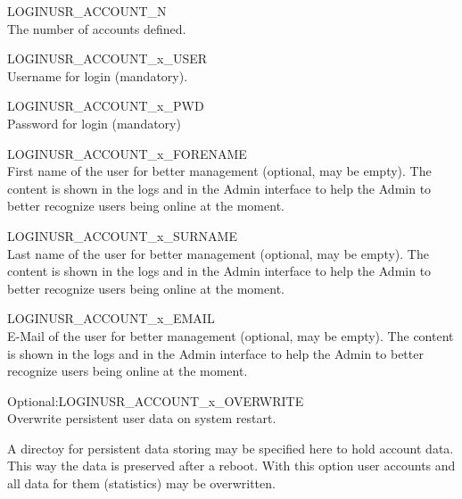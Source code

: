 \begin{description}

  LOGINUSR\_ACCOUNT\_N\\
  The number of accounts defined.\\



  LOGINUSR\_ACCOUNT\_x\_USER\\
  Username for login (mandatory).



  LOGINUSR\_ACCOUNT\_x\_PWD\\
  Password for login (mandatory)



  LOGINUSR\_ACCOUNT\_x\_FORENAME\\
  First name of the user for better management (optional, may be empty).
  The content is shown in the logs and in the Admin interface to help the Admin
  to better recognize users being online at the moment.



  LOGINUSR\_ACCOUNT\_x\_SURNAME\\
  Last name of the user for better management (optional, may be empty).
  The content is shown in the logs and in the Admin interface to help the Admin
  to better recognize users being online at the moment.



  LOGINUSR\_ACCOUNT\_x\_EMAIL\\
  E-Mail of the user for better management (optional, may be empty).
  The content is shown in the logs and in the Admin interface to help the Admin
  to better recognize users being online at the moment.



  Optional:LOGINUSR\_ACCOUNT\_x\_OVERWRITE\\
  Overwrite persistent user data on system restart.

  A directoy for persistent data storing may be specified here to hold account data.
  This way the data is preserved after a reboot. With this option
  user accounts and all data for them (statistics) may be overwritten.
\end{description}

